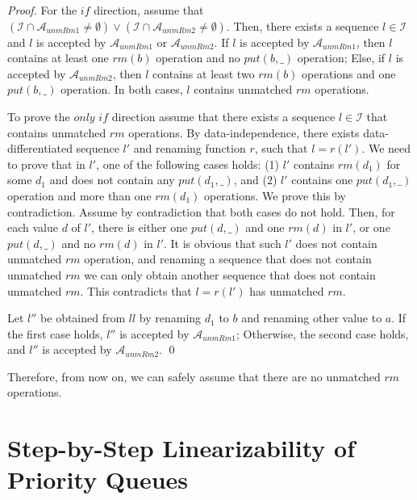 \begin {proof}

For the $\textit{if}$ direction, assume that $( \mathcal{I} \cap \mathcal{A}_{\textit{unmRm1}} \neq \emptyset) \vee ( \mathcal{I} \cap \mathcal{A}_{\textit{unmRm2}} \neq \emptyset )$. Then, there exists a sequence $l \in \mathcal{I}$ and $l$ is accepted by $\mathcal{A}_{\textit{unmRm1}}$ or $\mathcal{A}_{\textit{unmRm2}}$. If $l$ is accepted by $\mathcal{A}_{\textit{unmRm1}}$, then $l$ contains at least one $\textit{rm}(b)$ operation and no $\textit{put}(b,\_)$ operation; Else, if $l$ is accepted by $\mathcal{A}_{\textit{unmRm2}}$, then $l$ contains at least two $\textit{rm}(b)$ operations and one $\textit{put}(b,\_)$ operation. In both cases, $l$ contains unmatched $\textit{rm}$ operations.

To prove the $\textit{only if}$ direction assume that there exists a sequence $l \in \mathcal{I}$ that contains unmatched $\textit{rm}$ operations. By data-independence, there exists data-differentiated sequence $l'$ and renaming function $r$, such that $l=r(l')$. We need to prove that in $l'$, one of the following cases holds: (1) $l'$ contains $\textit{rm}(d_1)$ for some $d_1$ and does not contain any $\textit{put}(d_1,\_)$, and (2) $l'$ contains one $\textit{put}(d_1,\_)$ operation and more than one $\textit{rm}(d_1)$ operations. We prove this by contradiction. Assume by contradiction that both cases do not hold. Then, for each value $d$ of $l'$, there is either one $\textit{put}(d,\_)$ and one $\textit{rm}(d)$ in $l'$, or one $\textit{put}(d,\_)$ and no $\textit{rm}(d)$ in $l'$. It is obvious that such $l'$ does not contain unmatched $\textit{rm}$ operation, and renaming a sequence that does not contain unmatched $\textit{rm}$ we can only obtain another sequence that does not contain unmatched $\textit{rm}$. This contradicts that $l=r(l')$ has unmatched $\textit{rm}$.

Let $l''$ be obtained from $ll$ by renaming $d_1$ to $b$ and renaming other value to $a$. If the first case holds, $l''$ is accepted by $\mathcal{A}_{\textit{unmRm1}}$; Otherwise, the second case holds, and $l''$ is accepted by $\mathcal{A}_{\textit{unmRm2}}$. \qed
\end {proof}

Therefore, from now on, we can safely assume that there are no unmatched $\textit{rm}$ operations.







\section{Step-by-Step Linearizability of Priority Queues}
\label{sec:step-by-step linearizability of priority queues}











